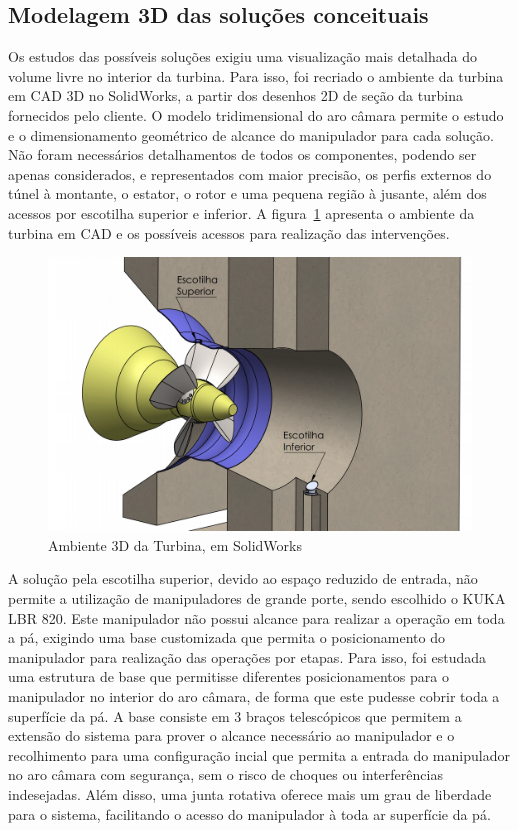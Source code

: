 \subsection{Modelagem 3D das soluções conceituais}
Os estudos das possíveis soluções exigiu uma visualização mais detalhada do
volume livre no interior da turbina. Para isso, foi recriado o ambiente da
turbina em CAD 3D no SolidWorks, a partir dos desenhos 2D de seção da turbina
fornecidos pelo cliente.
O modelo tridimensional do aro câmara permite o estudo e o dimensionamento geométrico de
alcance do manipulador para cada solução. Não foram necessários
detalhamentos de todos os componentes, podendo ser apenas considerados, e
representados com maior precisão, os perfis externos do túnel à montante, o
estator, o rotor e uma pequena região à jusante, além dos acessos
por escotilha superior e inferior.
A figura~\ref{fig::ambiente3d} apresenta o ambiente da turbina em CAD e os
possíveis acessos para realização das intervenções.

\begin{figure}[h!]
\centering
	\includegraphics[width=\columnwidth]{sota/figs/estudo/solid/ambiente_3d} 
	\caption{Ambiente 3D da Turbina, em SolidWorks}
	\label{fig::ambiente3d}
\end{figure}

A solução pela escotilha superior, devido ao espaço reduzido de entrada, não
permite a utilização de manipuladores de grande porte, sendo escolhido o KUKA
LBR 820. Este manipulador não possui alcance para realizar a operação em toda a
pá, exigindo uma base customizada que permita o
posicionamento do manipulador para realização das operações por etapas. Para
isso, foi estudada uma estrutura de base que permitisse diferentes
posicionamentos para o manipulador no interior do aro câmara, de forma que este
pudesse cobrir toda a superfície da pá. A base consiste em 3 braços
telescópicos que permitem a extensão do sistema para prover o alcance
necessário ao manipulador e o recolhimento para uma configuração incial que
permita a entrada do manipulador no aro câmara com segurança, sem o risco de
choques ou interferências indesejadas. Além disso, uma junta rotativa oferece mais um grau
de liberdade para o sistema, facilitando o acesso do manipulador à toda ar
superfície da pá. 

